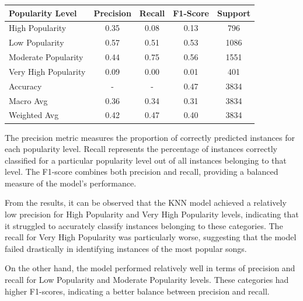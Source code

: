 \documentclass[11pt]{article} %
\begin{document}
\begin{table}[H]
	\centering
	\begin{tabular}{lcccc}
		\toprule
		\textbf{Popularity Level} & \textbf{Precision} & \textbf{Recall} & \textbf{F1-Score} & \textbf{Support} \\
		\midrule
		High Popularity           & 0.35               & 0.08            & 0.13              & 796              \\
		Low Popularity            & 0.57               & 0.51            & 0.53              & 1086             \\
		Moderate Popularity       & 0.44               & 0.75            & 0.56              & 1551             \\
		Very High Popularity      & 0.09               & 0.00            & 0.01              & 401              \\
		\hline
		Accuracy                  & -                  & -               & 0.47              & 3834             \\
		Macro Avg                 & 0.36               & 0.34            & 0.31              & 3834             \\
		Weighted Avg              & 0.42               & 0.47            & 0.40              & 3834             \\
		\bottomrule
	\end{tabular}
\end{table}

The precision metric measures the proportion of correctly predicted instances for each popularity level. Recall represents the percentage of instances correctly classified for a particular popularity level out of all instances belonging to that level. The F1-score combines both precision and recall, providing a balanced measure of the model's performance.

From the results, it can be observed that the KNN model achieved a relatively low precision for High Popularity and Very High Popularity levels, indicating that it struggled to accurately classify instances belonging to these categories. The recall for Very High Popularity was particularly worse, suggesting that the model failed drastically in identifying instances of the most popular songs.

On the other hand, the model performed relatively well in terms of precision and recall for Low Popularity and Moderate Popularity levels. These categories had higher F1-scores, indicating a better balance between precision and recall.
\end{document}

